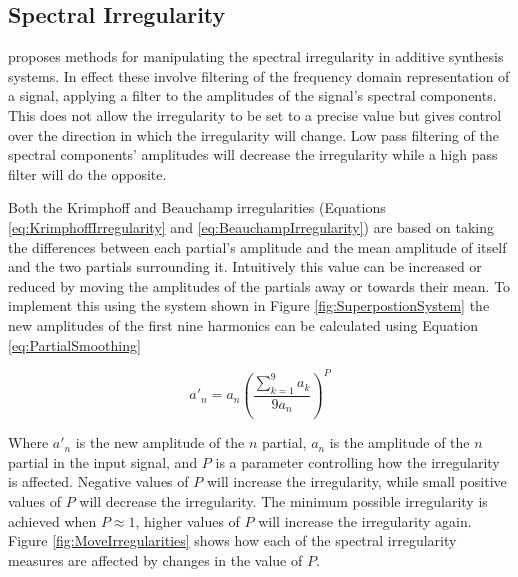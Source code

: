 	\subsection{Spectral Irregularity}
	\label{sec:FeatureControl-Parameterisation-Irregularity}
		\citet{beauchamp2007analysis} proposes methods for manipulating the spectral irregularity in additive
		synthesis systems. In effect these involve filtering of the frequency domain representation of a signal,
		applying a filter to the amplitudes of the signal's spectral components. This does not allow the
		irregularity to be set to a precise value but gives control over the direction in which the irregularity
		will change. Low pass filtering of the spectral components' amplitudes will decrease the irregularity while
		a high pass filter will do the opposite.
		
		Both the Krimphoff and Beauchamp irregularities (Equations \ref{eq:KrimphoffIrregularity} and
		\ref{eq:BeauchampIrregularity}) are based on taking the differences between each partial's amplitude and
		the mean amplitude of itself and the two partials surrounding it. Intuitively this value can be increased
		or reduced by moving the amplitudes of the partials away or towards their mean. To implement this using the
		system shown in Figure \ref{fig:SuperpostionSystem} the new amplitudes of the first nine harmonics can be
		calculated using Equation \ref{eq:PartialSmoothing}

		\begin{equation}
			a'_{n} = a_{n} \left( \frac{\sum_{k = 1}^{9} a_{k}}{9a_{n}} \right) ^{P}
			\label{eq:PartialSmoothing}
		\end{equation}

		Where $a'_{n}$ is the new amplitude of the $n$ partial, $a_{n}$ is the amplitude of the
		$n$ partial in the input signal, and $P$ is a parameter controlling how the irregularity is
		affected. Negative values of $P$ will increase the irregularity, while small positive values of $P$ will
		decrease the irregularity. The minimum possible irregularity is achieved when $P \approx 1$, higher values
		of $P$ will increase the irregularity again. Figure \ref{fig:MoveIrregularities} shows how each of the
		spectral irregularity measures are affected by changes in the value of $P$.

